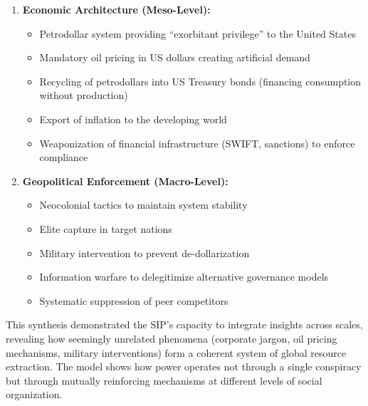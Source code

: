 \documentclass[11pt,a4paper]{article}
\begin{document}
\begin{small}
\begin{enumerate}[leftmargin=*]
    \item \textbf{Economic Architecture (Meso-Level):} 
    \begin{itemize}[nosep]
        \item Petrodollar system providing ``exorbitant privilege'' to the United States \citep{dialogue2}
        \item Mandatory oil pricing in US dollars creating artificial demand
        \item Recycling of petrodollars into US Treasury bonds (financing consumption without production)
        \item Export of inflation to the developing world
        \item Weaponization of financial infrastructure (SWIFT, sanctions) to enforce compliance
    \end{itemize}
    
    \item \textbf{Geopolitical Enforcement (Macro-Level):}
    \begin{itemize}[nosep]
        \item Neocolonial tactics to maintain system stability \citep{dialogue3,dialogue7}
        \item Elite capture in target nations
        \item Military intervention to prevent de-dollarization
        \item Information warfare to delegitimize alternative governance models
        \item Systematic suppression of peer competitors
    \end{itemize}
\end{enumerate}

This synthesis demonstrated the SIP's capacity to integrate insights across scales, revealing how seemingly unrelated phenomena (corporate jargon, oil pricing mechanisms, military interventions) form a coherent system of global resource extraction. The model shows how power operates not through a single conspiracy but through mutually reinforcing mechanisms at different levels of social organization.

\begin{figure}[ht]
\centering
{}
\end{figure}
\end{small}
\end{document}
